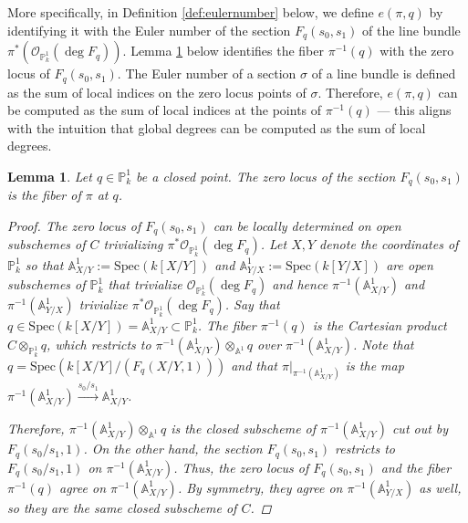 \documentclass[12pt, reqno]{amsart}
\newtheorem{lemma}[theorem]{Lemma}
\theoremstyle{definition}
\newcommand{\Spec}{\mathrm{Spec }} %
\newcommand{\A}{\mathbb{A}} %
\newcommand{\Proj}{\mathbb{P}} %
\begin{document}
More specifically, in Definition \ref{def:eulernumber} below, we define $e(\pi,q)$ by identifying it with the Euler number of the section $F_q(s_0,s_1)$ of the line bundle $\pi^*(\mathscr{O}_{\Proj^1_k}(\deg F_q))$. Lemma \ref{lemma:fiber} below identifies the fiber $\pi^{-1}(q)$ with the zero locus of $F_q(s_0, s_1)$. The Euler number of a section $\sigma$ of a line bundle is defined as the sum of local indices on the zero locus points of $\sigma$. Therefore, $e(\pi,q)$ can be computed as the sum of local indices at the points of $\pi^{-1}(q)$ --- this aligns with the intuition that global degrees can be computed as the sum of local degrees. 

\begin{lemma} \label{lemma:fiber}
Let $q \in \Proj^1_k$ be a closed point. The zero locus of the section $F_q(s_0,s_1)$ is the fiber of $\pi$ at $q$.
\begin{proof}
The zero locus of $F_q(s_0,s_1)$ can be locally determined on open subschemes of $C$ trivializing $\pi^* \mathscr{O}_{\Proj^1_k}(\deg F_q)$. Let $X,Y$ denote the coordinates of $\Proj^1_k$ so that $\A^1_{X/Y} := \Spec(k[X/Y])$ and $\A^1_{Y/X} := \Spec( k[Y/X])$ are open subschemes of $\Proj^1_k$ that trivialize $\mathscr{O}_{\Proj^1_k}(\deg F_q)$ and hence $\pi^{-1}(\A^1_{X/Y})$ and $\pi^{-1}(\A^1_{Y/X})$ trivialize $\pi^* \mathscr{O}_{\Proj^1_k}(\deg F_q)$. Say that $q \in \Spec(k[X/Y]) = \A^1_{X/Y} \subset \Proj^1_k$. The fiber $\pi^{-1}(q)$ is the Cartesian product $C \otimes_{\Proj^1_k} q$, which restricts to $\pi^{-1}(\A^1_{X/Y}) \otimes_{\A^1} q$ over $\pi^{-1}(\A^1_{X/Y})$. Note that $q = \Spec(k[X/Y]/(F_q(X/Y,1)))$ and that $\pi|_{\pi^{-1}(\A^1_{X/Y})}$ is the map $\pi^{-1} (\A^1_{X/Y}) \xrightarrow{s_0/s_1} \A^1_{X/Y}$.
\begin{center}
\end{center}
Therefore, $\pi^{-1}(\A^1_{X/Y}) \otimes_{\A^1} q$ is the closed subscheme of $\pi^{-1} (\A^1_{X/Y})$ cut out by $F_q(s_0/s_1,1)$. On the other hand, the section $F_q(s_0,s_1)$ restricts to $F_q(s_0/s_1,1)$ on $\pi^{-1}(\A^1_{X/Y})$. Thus, the zero locus of $F_q(s_0,s_1)$ and the fiber $\pi^{-1}(q)$ agree on $\pi^{-1}(\A^1_{X/Y})$. By symmetry, they agree on $\pi^{-1}(\A^1_{Y/X})$ as well, so they are the same closed subscheme of $C$.
\end{proof}
\end{lemma}
\end{document}
